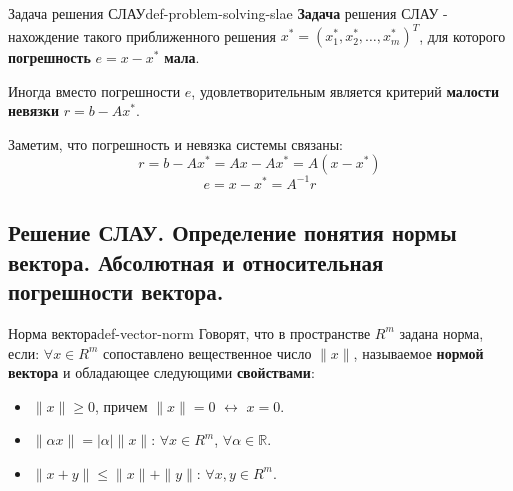 \documentclass[14pt]{extarticle}
\begin{document}
    \clearpage
    \begin{definition}{Задача решения СЛАУ}{def-problem-solving-slae}
        \textbf{Задача} решения СЛАУ - нахождение такого приближенного решения $x^{*}= (x_{1}^{*}, x_{2}^{*}, \ldots, x_{m}^{*})^{T}$, для которого \textbf{погрешность} $e = x - x^{*}$ \textbf{мала}.
        
        \vspace{\baselineskip}
        
        Иногда вместо погрешности $e$, удовлетворительным является критерий \textbf{малости невязки} $r = b - Ax^{*}$. 
        
        \vspace{\baselineskip}
        
        Заметим, что погрешность и невязка системы связаны:
        $$r = b - Ax^{*} = Ax - Ax^{*} = A(x - x^{*})$$
        $$e = x - x^{*} = A^{-1}r$$
    \end{definition}


\clearpage
\subsection{Решение СЛАУ. Определение понятия нормы вектора. Абсолютная и относительная погрешности вектора.}

    \begin{definition}{Норма вектора}{def-vector-norm}
        Говорят, что в пространстве $R^{m}$ задана норма, если: $\forall x \in R^{m}$ сопоставлено вещественное число $\|x\|$, называемое \textbf{нормой вектора} и обладающее следующими \textbf{свойствами}:
        \begin{itemize}
            \item $\|x\| \geq 0$, причем $\|x\| = 0$ $\leftrightarrow$ $x = 0$.
            \item $\|\alpha x\| = |\alpha| \|x\|$: $\forall x \in R^{m}$, $\forall \alpha \in \mathbb{R}$.
            \item $\|x + y\| \leq \|x\| + \|y\|$: $\forall x, y \in R^{m}$.
        \end{itemize}
    \end{definition}
\end{document}
